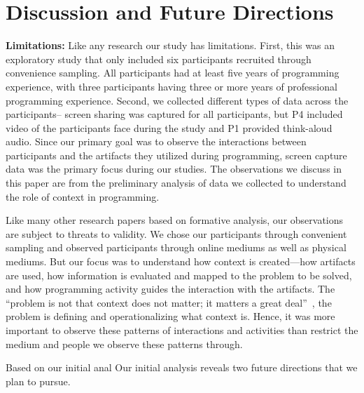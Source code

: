 
\section{Discussion and Future Directions}
\textbf{Limitations:} Like any research our study has limitations. First, this was an exploratory study that only included six participants recruited through convenience sampling. All participants had at least five years of programming experience, with three participants having three or more years of professional programming experience. Second, we collected different types of data across the participants-- screen sharing was captured for all participants, but P4 included video of the participants face during the study and P1 provided think-aloud audio. Since our primary goal was to observe the interactions between participants and the artifacts they utilized during programming, screen capture data was the primary focus during our studies. The observations we discuss in this paper are from the preliminary analysis of data we collected to understand the role of context in programming.


 Like many other research papers based on formative analysis, our observations  are subject to threats to validity. We chose our participants through convenient sampling and observed participants through online mediums as well as physical mediums. But our focus was to understand how context is created---how artifacts are used, how information is evaluated and mapped to the problem to be solved, and how programming activity guides the interaction with the artifacts. The ``problem is not that context does not matter; it matters a great deal''~\cite{Dourish:2004}, the problem is defining and operationalizing what context is. Hence, it was more important to observe these patterns of interactions and activities than restrict the medium and people we observe these patterns through.

Based on our initial anal
Our initial analysis reveals two future directions that we plan to pursue. 

